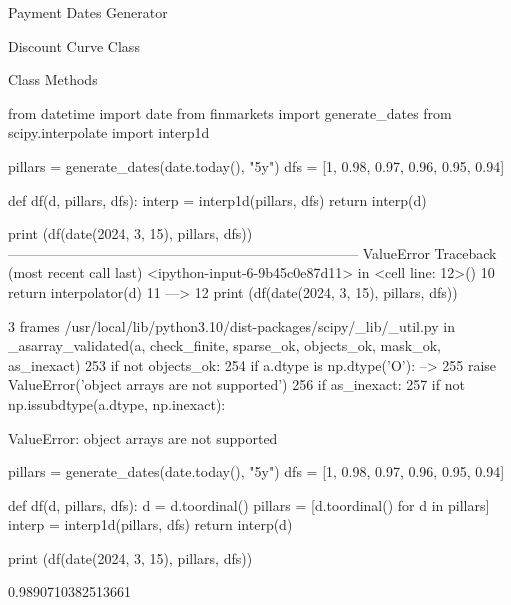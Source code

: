 \documentclass{beamer}
\begin{document}
\begin{frame}[fragile]{Payment Dates Generator}
\begin{itemize}
\begin{frame}{Discount Curve Class}
\begin{frame}{Class Methods}
\begin{itemize}
\begin{iptyhon}





from datetime import date
from finmarkets import generate_dates
from scipy.interpolate import interp1d 

pillars = generate_dates(date.today(), "5y")
dfs = [1, 0.98, 0.97, 0.96, 0.95, 0.94]

def df(d, pillars, dfs):
  interp = interp1d(pillars, dfs)
  return interp(d)

print (df(date(2024, 3, 15), pillars, dfs))
---------------------------------------------------------------------------
ValueError                                Traceback (most recent call last)
<ipython-input-6-9b45c0e87d11> in <cell line: 12>()
     10   return interpolator(d)
     11 
---> 12 print (df(date(2024, 3, 15), pillars, dfs))

3 frames
/usr/local/lib/python3.10/dist-packages/scipy/_lib/_util.py in _asarray_validated(a, check_finite, sparse_ok, objects_ok, mask_ok, as_inexact)
    253     if not objects_ok:
    254         if a.dtype is np.dtype('O'):
--> 255             raise ValueError('object arrays are not supported')
    256     if as_inexact:
    257         if not np.issubdtype(a.dtype, np.inexact):

ValueError: object arrays are not supported

pillars = generate_dates(date.today(), "5y")
dfs = [1, 0.98, 0.97, 0.96, 0.95, 0.94]

def df(d, pillars, dfs):
  d = d.toordinal()
  pillars = [d.toordinal() for d in pillars]
  interp = interp1d(pillars, dfs)
  return interp(d)

print (df(date(2024, 3, 15), pillars, dfs))
  
0.9890710382513661  










\end{iptyhon}
\end{itemize}
\end{frame}
\end{frame}
\end{itemize}
\end{frame}
\end{document}
